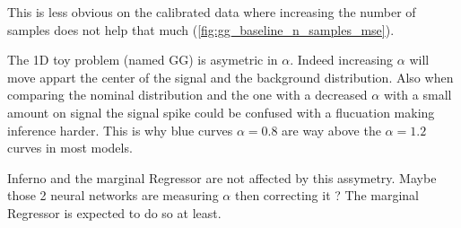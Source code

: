 This is less obvious on the calibrated data where increasing the number of samples does not help that much (\autoref{fig:gg_baseline_n_samples_mse}).

The 1D toy problem (named GG) is asymetric in $\alpha$.
Indeed increasing $\alpha$ will move appart the center of the signal and the background distribution.
Also when comparing the nominal distribution and the one with a decreased $\alpha$ with a small amount on signal the signal spike could be confused with a flucuation making inference harder.
This is why blue curves $\alpha=0.8$ are way above the $\alpha=1.2$ curves in most models.

Inferno and the marginal Regressor are not affected by this assymetry.
Maybe those 2 neural networks are measuring $\alpha$ then correcting it ?
The marginal Regressor is expected to do so at least.




